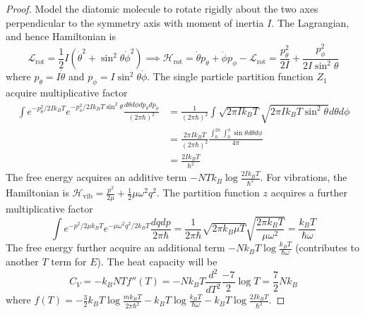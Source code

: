 \documentclass[a4paper]{article}
\theoremstyle{new}
\begin{document}
\begin{proof}
Model the diatomic molecule to rotate rigidly about the two axes perpendicular to the symmetry axis with moment of inertia $I$. The Lagrangian, and hence Hamiltonian is
$$\mathcal{L}_{\text{rot}}=\frac{1}{2}I(\dot{\theta}^2+\sin^2\theta\dot{\phi}^2)\implies \mathcal{H}_{\text{rot}}=\dot{\theta}p_\theta+\dot{\phi}p_\phi-\mathcal{L}_{\text{rot}}=\frac{p_\theta^2}{2I}+\frac{p_\phi^2}{2I\sin^2\theta}$$
where $p_\theta=I\dot{\theta}$ and $p_\phi=I\sin^2\theta\dot{\phi}$. The single particle partition function $Z_1$ acquire multiplicative factor
\begin{align}
\int e^{-p_\theta^2/2Ik_BT}e^{-p_\phi^2/2Ik_BT\sin^2\theta}\frac{d\theta d\phi dp_\theta dp_\phi}{(2\pi\hbar)^2}&=\frac{1}{(2\pi\hbar)^2}\int\sqrt{2\pi Ik_BT}\sqrt{2\pi Ik_BT\sin^2\theta} d\theta d\phi\nonumber\\&=\frac{2\pi Ik_BT}{(2\pi\hbar)^2}\frac{\int_0^{2\pi}\int^\pi_0\sin\theta d\theta d\phi}{4\pi}\nonumber\\&=\frac{2Ik_BT}{\hbar^2}\nonumber
\end{align}
The free energy acquires an additive term $-NTk_B\log\frac{2Ik_BT}{\hbar^2}$. For vibrations, the Hamiltonian is $\mathcal{H}_{\text{vib}}=\frac{p^2}{2\mu}+\frac{1}{2}\mu\omega^2q^2$. The partition function $z$ acquires a further multiplicative factor
$$\int e^{-p^2/2\mu k_B T}e^{-\mu\omega^2q^2/2k_BT}\frac{dqdp}{2\pi\hbar}=\frac{1}{2\pi\hbar}\sqrt{2\pi k_B\mu T}\sqrt{\frac{2\pi k_B T}{\mu\omega^2}}=\frac{k_BT}{\hbar\omega}$$
The free energy further acquire an additional term $-Nk_BT\log\frac{k_BT}{\hbar\omega}$ (contributes to another $T$ term for $E$). 
The heat capacity will be 
$$C_V=-k_BNTf''(T)=-Nk_BT\frac{d^2}{dT^2}\frac{-7}{2}\log T=\frac{7}{2}Nk_B$$
where $f(T)=-\frac{3}{2}k_BT\log\frac{mk_BT}{2\pi\hbar^2}-k_BT\log\frac{k_BT}{\hbar\omega}-k_BT\log\frac{2Ik_BT}{\hbar^2}$. 
\end{proof}
\end{document}
